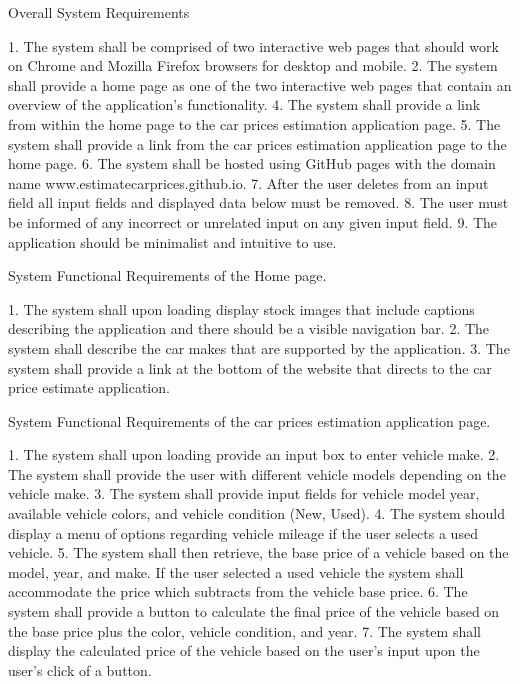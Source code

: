 
\begin{spverbatim}
Overall System Requirements

1. The system shall be comprised of two interactive web pages that should work on Chrome and Mozilla Firefox browsers for desktop and mobile. 
2. The system shall provide a home page as one of the two interactive web pages that contain an overview of the application's functionality.
4. The system shall provide a link from within the home page to the car prices estimation application page.
5. The system shall provide a link from the car prices estimation 
application page to the home page. 
6. The system shall be hosted using GitHub pages with the domain name www.estimatecarprices.github.io.
7. After the user deletes from an input field all input fields and displayed data below must be removed.
8. The user must be informed of any incorrect or unrelated input on any given input field.
9. The application should be minimalist and intuitive to use.

System Functional Requirements of the Home page.

1. The system shall upon loading display stock images that include captions describing the application and there should 
be a visible navigation bar.
2. The system shall describe the car makes that are supported by the application. 
3. The system shall provide a link at the bottom of the website that directs to the car price estimate application. 

System Functional Requirements of the car prices estimation application page.

1. The system shall upon loading provide an input box to enter vehicle make.
2. The system shall provide the user with different vehicle models depending on the vehicle make.
3. The system shall provide input fields for vehicle model year, available vehicle colors, and vehicle condition (New, Used).
4. The system should display a menu of options regarding vehicle mileage if the user selects a used vehicle.
5. The system shall then retrieve, the base price of a vehicle based on the model, year, and make. If the user selected a used vehicle the system shall accommodate the price which subtracts from the vehicle base price.
6. The system shall provide a button to calculate the final price of the vehicle based on the base price plus the color, vehicle condition, and year.
7. The system shall display the calculated price of the vehicle based on the user's input upon the user's click of a button.
\end{spverbatim}
